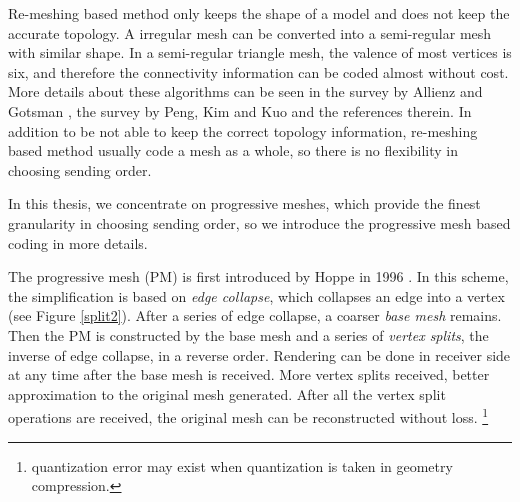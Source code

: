\documentclass[11pt, a4paper]{report}
\begin{document}
    Re-meshing based method only keeps the shape of a model
    and does not keep the accurate topology. 
    A irregular mesh can be converted into a semi-regular mesh
    with similar shape. In a semi-regular
    triangle mesh, the valence of most vertices is six, and therefore
    the connectivity information can be coded almost without cost.
    More details about these algorithms can be seen in the survey by Allienz and Gotsman
    \cite{recent:alliez}, the survey by Peng, Kim and Kuo
    \cite{technologies:peng} and the references therein.
    In addition to be not able to keep the correct topology information,
    re-meshing based method usually code a mesh as a whole, so there is 
    no flexibility in choosing sending order.

    In this thesis, we concentrate on progressive meshes, which provide 
    the finest granularity in choosing sending order, so 
    we introduce the progressive mesh based coding in more details.

    The progressive mesh (PM) \label{progressive_mesh}is first
    introduced by Hoppe in 1996 \cite{hoppe96progressive}. In this
    scheme, the simplification is based on \emph{edge collapse}, which
    collapses an edge into a vertex (see Figure \ref{split2}).
    After a series of edge collapse, a coarser \emph{base mesh} remains. 
    Then the PM is constructed by the base mesh and a series of \emph{vertex
    splits}, the inverse of edge collapse, in a reverse order.
    Rendering can be done in receiver side at any time after the base
    mesh is received. More vertex splits received, better
    approximation to the original mesh generated. After all
    the vertex split operations are received, the original mesh can be
    reconstructed without loss. \footnote{quantization error may exist
    when quantization is taken in geometry compression.}
\end{document}
